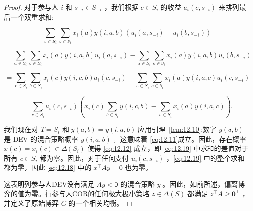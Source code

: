 \begin{proof}
对于参与人 \(i\) 和 \({s}_{-i} \in  {S}_{-i}\) ，我们根据 \(c \in  {S}_{i}\) 的收益 \({u}_{i}\left( {c,{s}_{-i}}\right)\) 来排列最后一个双重求和:

\[
\mathop{\sum }\limits_{{a \in  {S}_{i}}}\mathop{\sum }\limits_{{b \in  {S}_{i}}}{x}_{i}\left( a\right) y\left( {i,a,b}\right) \left( {{u}_{i}\left( {a,{s}_{-i}}\right)  - {u}_{i}\left( {b,{s}_{-i}}\right) }\right)
\]

\[
= \mathop{\sum }\limits_{{a \in  {S}_{i}}}\mathop{\sum }\limits_{{b \in  {S}_{i}}}{x}_{i}\left( a\right) y\left( {i,a,b}\right) {u}_{i}\left( {a,{s}_{-i}}\right)  - \mathop{\sum }\limits_{{a \in  {S}_{i}}}\mathop{\sum }\limits_{{b \in  {S}_{i}}}{x}_{i}\left( a\right) y\left( {i,a,b}\right) {u}_{i}\left( {b,{s}_{-i}}\right)
\]

\[
= \mathop{\sum }\limits_{{c \in  {S}_{i}}}\mathop{\sum }\limits_{{b \in  {S}_{i}}}{x}_{i}\left( c\right) y\left( {i,c,b}\right) {u}_{i}\left( {c,{s}_{-i}}\right)  - \mathop{\sum }\limits_{{a \in  {S}_{i}}}\mathop{\sum }\limits_{{c \in  {S}_{i}}}{x}_{i}\left( a\right) y\left( {i,a,c}\right) {u}_{i}\left( {c,{s}_{-i}}\right)
\]

\begin{equation}
= \mathop{\sum }\limits_{{c \in  {S}_{i}}}{u}_{i}\left( {c,{s}_{-i}}\right) \left( {{x}_{i}\left( c\right) \mathop{\sum }\limits_{{b \in  {S}_{i}}}y\left( {i,c,b}\right)  - \mathop{\sum }\limits_{{a \in  {S}_{i}}}{x}_{i}\left( a\right) y\left( {i,a,c}\right) }\right) . \label{eq:12.19}
\end{equation}

我们现在对 \(T = {S}_{i}\) 和 \(y\left( {a,b}\right)  = y\left( {i,a,b}\right)\) 应用引理~\ref{lem:12.10}:数字 \(y\left( {a,b}\right)\) 是 DEV 的混合策略概率 \(y\left( {i,a,b}\right)\) ，这意味着 \eqref{eq:12.11}成立。因此，存在概率 \(x\left( c\right)  = {x}_{i}\left( c\right)  \in  \Delta \left( {S}_{i}\right)\) 使得 \eqref{eq:12.12} 成立，即 \eqref{eq:12.19} 中求和的差值对于所有 \(c \in  {S}_{i}\) 都为零。因此，对于任何支付 \({u}_{i}\left( {c,{s}_{-i}}\right)\) ，\eqref{eq:12.19} 中的整个求和都为零，因此 \eqref{eq:12.18} 中的 \({x}^{\top }{Ay} = 0\) 也为零。

这表明列参与人DEV没有满足 \({Ay} < \bm{0}\) 的混合策略 \(y\) 。因此，如前所述，偏离博弈的值为零。行参与人COR的任何极大极小策略 \(z \in  \Delta \left( S\right)\) 都满足 \({z}^{\top }A \geq  {\bm{0}}^{\top }\) ，并定义了原始博弈 \(G\) 的一个相关均衡。
\end{proof}

